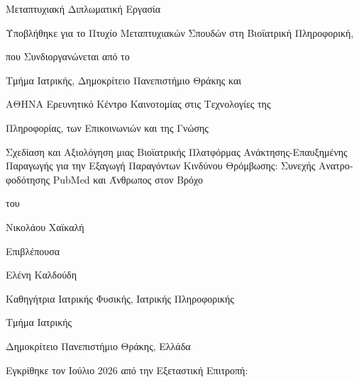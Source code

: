 \clearpage
\thispagestyle{empty}
\begin{greek}
\begin{center}

{\large Μεταπτυχιακή Διπλωματική Εργασία\par}
\vspace{0.2cm}
{\small Υποβλήθηκε για το Πτυχίο Μεταπτυχιακών Σπουδών στη Βιοϊατρική Πληροφορική,\par}
{\small που Συνδιοργανώνεται από το\par}
{\small Τμήμα Ιατρικής, Δημοκρίτειο Πανεπιστήμιο Θράκης και\par}
{\small ΑΘΗΝΑ Ερευνητικό Κέντρο Καινοτομίας στις Τεχνολογίες της\par}
{\small Πληροφορίας, των Επικοινωνιών και της Γνώσης\par}

\vspace{1.0cm}

{\Large Σχεδίαση και Αξιολόγηση μιας Βιοϊατρικής Πλατφόρμας Ανάκτησης-Επαυξημένης Παραγωγής για την Εξαγωγή Παραγόντων Κινδύνου Θρόμβωσης: Συνεχής Ανατροφοδότησης PubMed και Άνθρωπος στον Βρόχο \par}

\vspace{1.0cm}
{\large του\par}
\vspace{0.3cm}
{\large Νικολάου Χαϊκαλή\par}

\vspace{1.2cm}

{\large Επιβλέπουσα\par}
\vspace{0.3cm}
{\large Ελένη Καλδούδη\par}
{\small Καθηγήτρια Ιατρικής Φυσικής, Ιατρικής Πληροφορικής\par}
{\small Τμήμα Ιατρικής\par}
{\small Δημοκρίτειο Πανεπιστήμιο Θράκης, Ελλάδα\par}

\vfill

{\small Εγκρίθηκε τον Ιούλιο 2026 από την Εξεταστική Επιτροπή:\par}
\vspace{0.8cm}


\end{center}
\end{greek}
